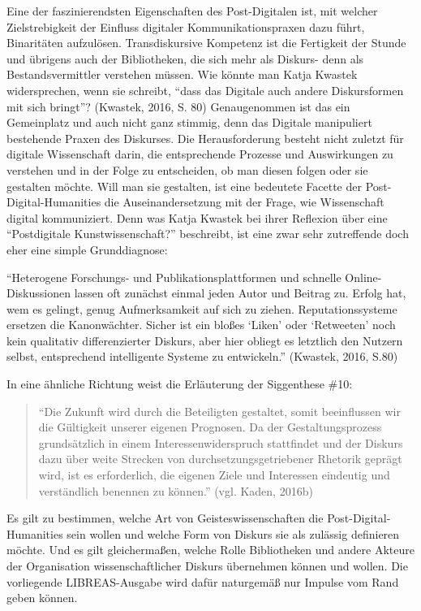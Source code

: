 \documentclass[a4paper,
fontsize=11pt,
oneside,
numbers=noperiodatend,
parskip=half-,
bibliography=totoc,
final
]{scrartcl}
\begin{document}
Eine der faszinierendsten Eigenschaften des Post-Digitalen ist, mit
welcher Zielstrebigkeit der Einfluss digitaler Kommunikationspraxen dazu
führt, Binaritäten aufzulösen. Transdiskursive Kompetenz ist die
Fertigkeit der Stunde und übrigens auch der Bibliotheken, die sich mehr
als Diskurs- denn als Bestandsvermittler verstehen müssen. Wie könnte
man Katja Kwastek widersprechen, wenn sie schreibt, \enquote{dass das
Digitale auch andere Diskursformen mit sich bringt}? (Kwastek, 2016, S.
80) Genaugenommen ist das ein Gemeinplatz und auch nicht ganz stimmig,
denn das Digitale manipuliert bestehende Praxen des Diskurses. Die
Herausforderung besteht nicht zuletzt für digitale Wissenschaft darin,
die entsprechende Prozesse und Auswirkungen zu verstehen und in der
Folge zu entscheiden, ob man diesen folgen oder sie gestalten möchte.
Will man sie gestalten, ist eine bedeutete Facette der
Post-Digital-Humanities die Auseinandersetzung mit der Frage, wie
Wissenschaft digital kommuniziert. Denn was Katja Kwastek bei ihrer
Reflexion über eine \enquote{Postdigitale Kunstwissenschaft?}
beschreibt, ist eine zwar sehr zutreffende doch eher eine simple
Grunddiagnose:

\enquote{Heterogene Forschungs- und Publikationsplattformen und schnelle
Online-Diskussionen lassen oft zunächst einmal jeden Autor und Beitrag
zu. Erfolg hat, wem es gelingt, genug Aufmerksamkeit auf sich zu ziehen.
Reputationssysteme ersetzen die Kanonwächter. Sicher ist ein bloßes
\enquote{Liken} oder \enquote{Retweeten} noch kein qualitativ
differenzierter Diskurs, aber hier obliegt es letztlich den Nutzern
selbst, entsprechend intelligente Systeme zu entwickeln.} (Kwastek,
2016, S.80)

In eine ähnliche Richtung weist die Erläuterung der Siggenthese \#10:

\begin{quote}
\enquote{Die Zukunft wird durch die Beteiligten gestaltet, somit
beeinflussen wir die Gültigkeit unserer eigenen Prognosen. Da der
Gestaltungsprozess grundsätzlich in einem Interessenwiderspruch
stattfindet und der Diskurs dazu über weite Strecken von
durchsetzungsgetriebener Rhetorik geprägt wird, ist es erforderlich, die
eigenen Ziele und Interessen eindeutig und verständlich benennen zu
können.} (vgl. Kaden, 2016b)
\end{quote}

Es gilt zu bestimmen, welche Art von Geisteswissenschaften die
Post-Digital-Humanities sein wollen und welche Form von Diskurs sie als
zulässig definieren möchte. Und es gilt gleichermaßen, welche Rolle
Bibliotheken und andere Akteure der Organisation wissenschaftlicher
Diskurs übernehmen können und wollen. Die vorliegende LIBREAS-Ausgabe
wird dafür naturgemäß nur Impulse vom Rand geben können.
\end{document}
